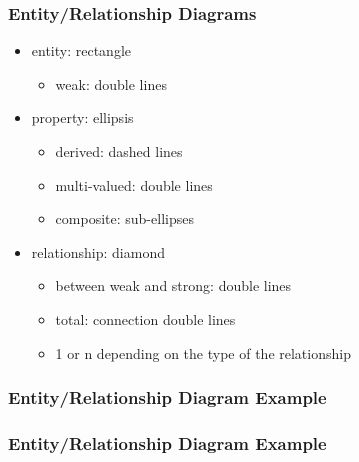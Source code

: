 \documentclass[dvipsnames]{beamer}
\begin{document}
\begin{frame}
  \frametitle{Entity/Relationship Diagrams}

  \begin{itemize}
    \item entity: rectangle
    \begin{itemize}
      \item weak: double lines
    \end{itemize}

    \pause
    \item property: ellipsis
    \begin{itemize}
      \item derived: dashed lines
      \item multi-valued: double lines
      \item composite: sub-ellipses
    \end{itemize}

    \pause
    \item relationship: diamond
    \begin{itemize}
      \item between weak and strong: double lines
      \item total: connection double lines
      \item 1 or n depending on the type of the relationship
    \end{itemize}
 \end{itemize}
\end{frame}

\begin{frame}
  \frametitle{Entity/Relationship Diagram Example}

  \begin{example}
    \begin{center}
    \end{center}
  \end{example}
\end{frame}

\begin{frame}
  \frametitle{Entity/Relationship Diagram Example}

  \begin{example}
    \begin{center}
    \end{center}
  \end{example}
\end{frame}
\end{document}
